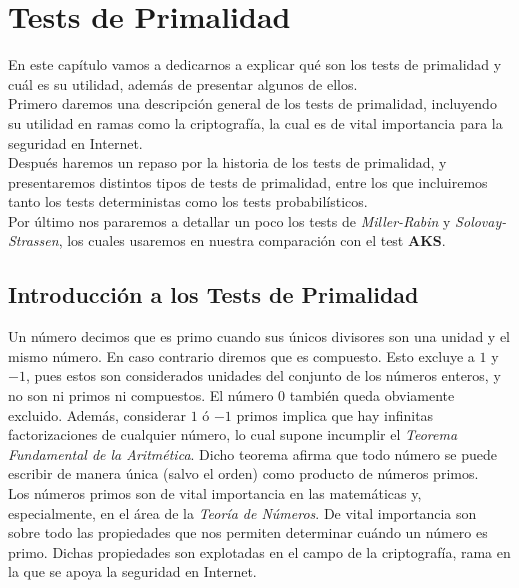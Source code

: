 \chapter{Tests de Primalidad}

En este capítulo vamos a dedicarnos a explicar qué son los tests de primalidad y cuál es su utilidad, además de presentar algunos de ellos.\\

Primero daremos una descripción general de los tests de primalidad, incluyendo su utilidad en ramas como la criptografía, la cual es de vital importancia para la seguridad en Internet.\\

Después haremos un repaso por la historia de los tests de primalidad, y presentaremos distintos tipos de tests de primalidad, entre los que incluiremos tanto los tests deterministas como los tests probabilísticos.\\

Por último nos pararemos a detallar un poco los tests de \textit{Miller-Rabin} y \textit{Solovay-Strassen}, los cuales usaremos en nuestra comparación con el test \textbf{AKS}.

\section{Introducción a los Tests de Primalidad}

Un número decimos que es primo cuando sus únicos divisores son una unidad y el mismo número. En caso contrario diremos que es compuesto. Esto excluye a $1$ y $-1$, pues estos son considerados unidades del conjunto de los números enteros, y no son ni primos ni compuestos. El número $0$ también queda obviamente excluido. Además, considerar $1$ ó $-1$ primos implica que hay infinitas factorizaciones de cualquier número, lo cual supone incumplir el \textit{Teorema Fundamental de la Aritmética}. Dicho teorema afirma que todo número se puede escribir de manera única (salvo el orden) como producto de números primos.\\

Los números primos son de vital importancia en las matemáticas y, especialmente, en el área de la \textit{Teoría de Números}. De vital importancia son sobre todo las propiedades que nos permiten determinar cuándo un número es primo. Dichas propiedades son explotadas en el campo de la criptografía, rama en la que se apoya la seguridad en Internet.\\


